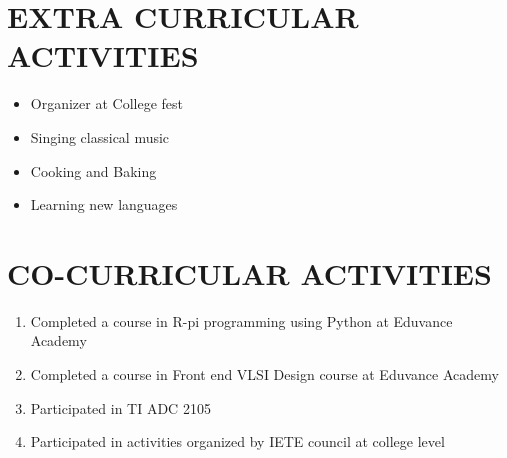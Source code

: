 \documentclass[line, margin]{res}
\begin{document}
\begin{resume}
\section{\bf EXTRA CURRICULAR ACTIVITIES}
\begin{itemize}
	\item Organizer at College fest  
	\item Singing classical music
	\item Cooking and Baking
	\item Learning new languages
\end{itemize}

\section{\bf CO-CURRICULAR ACTIVITIES}
\begin{enumerate}
	\item Completed a course in R-pi programming using Python at Eduvance Academy
	\item Completed a course in Front end VLSI Design course at Eduvance Academy
	\item Participated in TI ADC 2105
	\item Participated in activities organized by IETE council at college level
\end{enumerate}

\end{resume}
\end{document}
